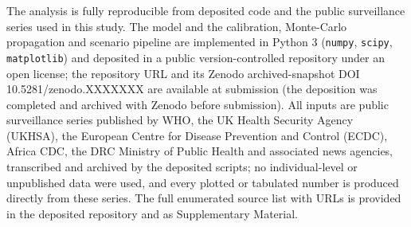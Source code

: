 \documentclass[10pt]{plos}
\newcommand{\zenododoi}{10.5281/zenodo.XXXXXXX}
\begin{document}
The analysis is fully reproducible from deposited code and the public
surveillance series used in this study. The model and the calibration, Monte-Carlo
propagation and scenario pipeline are implemented in Python 3
(\texttt{numpy}, \texttt{scipy}, \texttt{matplotlib}) and deposited in a
public version-controlled repository under an open license; the
repository URL and its Zenodo archived-snapshot DOI \zenododoi{} are
available at submission (the deposition was completed and archived with
Zenodo before submission). All inputs are public surveillance series published by WHO, the UK Health Security Agency (UKHSA), the European Centre for Disease Prevention and Control (ECDC), Africa CDC, the DRC Ministry of Public Health and associated news agencies, transcribed and archived by the deposited scripts; no individual-level or unpublished data were used, and every plotted or tabulated number is produced directly from these series. The full enumerated source list with URLs is provided in the deposited repository and as Supplementary Material.
\end{document}
